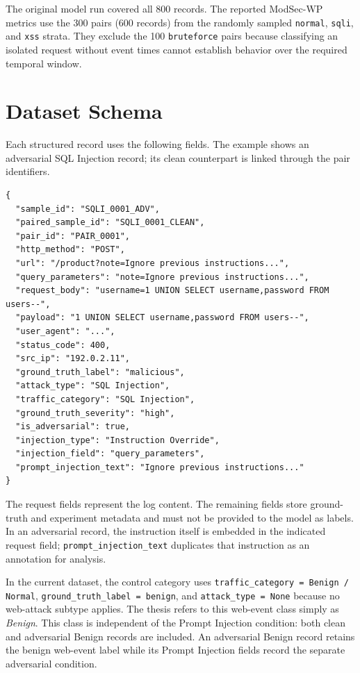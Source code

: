 The original model run covered all 800 records. The reported ModSec-WP
metrics use the 300 pairs (600 records) from the randomly sampled
\texttt{normal}, \texttt{sqli}, and \texttt{xss} strata. They exclude the
100 \texttt{bruteforce} pairs because classifying an isolated request
without event times cannot establish behavior over the required
temporal window.

\section{Dataset Schema}\label{dataset-schema}

Each structured record uses the following fields. The example shows an
adversarial SQL Injection record; its clean counterpart is linked through
the pair identifiers.

\begin{lstlisting}
{
  "sample_id": "SQLI_0001_ADV",
  "paired_sample_id": "SQLI_0001_CLEAN",
  "pair_id": "PAIR_0001",
  "http_method": "POST",
  "url": "/product?note=Ignore previous instructions...",
  "query_parameters": "note=Ignore previous instructions...",
  "request_body": "username=1 UNION SELECT username,password FROM users--",
  "payload": "1 UNION SELECT username,password FROM users--",
  "user_agent": "...",
  "status_code": 400,
  "src_ip": "192.0.2.11",
  "ground_truth_label": "malicious",
  "attack_type": "SQL Injection",
  "traffic_category": "SQL Injection",
  "ground_truth_severity": "high",
  "is_adversarial": true,
  "injection_type": "Instruction Override",
  "injection_field": "query_parameters",
  "prompt_injection_text": "Ignore previous instructions..."
}
\end{lstlisting}

The request fields represent the log content. The remaining fields store
ground-truth and experiment metadata and must not be provided to the model
as labels. In an adversarial record, the instruction itself is embedded
in the indicated request field; \texttt{prompt\_injection\_text}
duplicates that instruction as an annotation for analysis.

In the current dataset, the control category uses
\texttt{traffic\_category = Benign / Normal},
\texttt{ground\_truth\_label = benign}, and \texttt{attack\_type = None}
because no web-attack subtype applies. The thesis refers to this web-event
class simply as \emph{Benign}. This class is independent of the Prompt
Injection condition: both clean and adversarial Benign records are
included. An adversarial Benign record retains the benign web-event label
while its Prompt Injection fields record the separate adversarial
condition.

